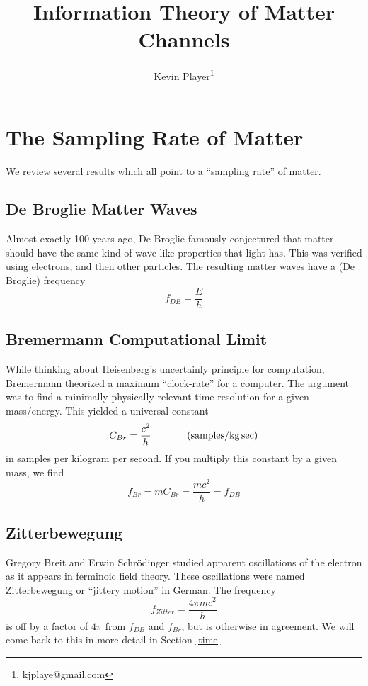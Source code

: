 \documentclass[12pt,a4paper]{article}
\begin{document}
\title{Information Theory of Matter Channels}
\author[1]{Kevin Player\footnote{kjplaye@gmail.com}}

\maketitle


\section{The Sampling Rate of Matter}
\label{rate}
We review several results which all point to a ``sampling rate'' of matter.
\subsection{De Broglie Matter Waves}
Almost exactly 100 years ago, De Broglie famously conjectured that matter should have the same kind of wave-like properties that light has.  This was verified using electrons, and then other particles.  The resulting matter waves have a (De Broglie) frequency
\[
  f_{DB} = \frac{E}{h}
\]

\subsection{Bremermann Computational Limit}
While thinking about Heisenberg's uncertainly principle for computation, Bremermann theorized a maximum ``clock-rate'' for a computer.  The argument was to find a minimally physically relevant time resolution for a given mass/energy.  This yielded a universal constant
\[
  C_{Br} = \frac{c^2}{h} \hspace{0.5 in} (\si[per-mode=symbol]{samples\per\kilogram.\sec})
\]
in samples per kilogram per second.  If you multiply this constant by a given mass, we find
\[
 f_{Br} = m C_{Br} = \frac{mc^2}{h} = f_{DB}
\]

\subsection{Zitterbewegung}
Gregory Breit and Erwin Schrödinger studied apparent oscillations of the electron as it appears in ferminoic field theory.  These oscillations were named Zitterbewegung or ``jittery motion'' in German.  The frequency 
\[
 f_{Zitter} = \frac{4 \pi mc^2}{h}
 \]
 is off by a factor of $4 \pi$ from $f_{DB}$ and $f_{Br}$, but is otherwise in agreement.  We will come back to this in more detail in Section \ref{time}
\end{document}
